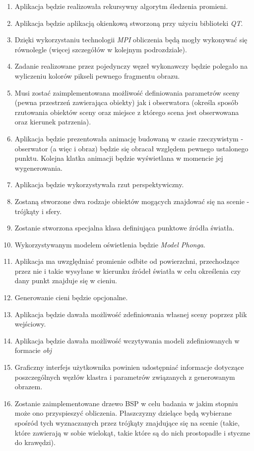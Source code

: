\begin{enumerate}
	\item Aplikacja będzie realizowała rekursywny algorytm śledzenia promieni.
	\item Aplikacja będzie aplikacją okienkową stworzoną przy użyciu biblioteki \emph{QT}.
	\item Dzięki wykorzystaniu technologii \emph{MPI} obliczenia będą mogły wykonywać się równolegle (więcej szczegółów w kolejnym podrozdziale).
	\item Zadanie realizowane przez pojedynczy węzeł wykonawczy będzie polegało na wyliczeniu kolorów pikseli pewnego fragmentu obrazu.
	\item Musi zostać zaimplementowana możliwość definiowania parametrów sceny (pewna przestrzeń zawierająca obiekty) jak i obserwatora (określa sposób rzutowania obiektów sceny oraz miejsce z którego scena jest obserwowana oraz kierunek patrzenia).
	\item Aplikacja będzie prezentowała animację budowaną w czasie rzeczywistym - obserwator (a więc i obraz) będzie się obracał względem pewnego ustalonego punktu. Kolejna klatka animacji będzie wyświetlana w momencie jej wygenerowania.
	\item Aplikacja będzie wykorzystywała rzut perspektywiczny.
	\item Zostaną stworzone dwa rodzaje obiektów mogących znajdować się na scenie - trójkąty i sfery.
	\item Zostanie stworzona specjalna klasa definiująca punktowe źródła światła.
	\item Wykorzystywanym modelem oświetlenia będzie \emph{Model Phonga}.
	\item Aplikacja ma uwzględniać promienie odbite od powierzchni, przechodzące przez nie i takie wysyłane w kierunku źródeł światła w celu określenia czy dany punkt znajduje się w cieniu.
	\item Generowanie cieni będzie opcjonalne.
	\item Aplikacja będzie dawała możliwość zdefiniowania własnej sceny poprzez plik wejściowy.
	\item Aplikacja będzie dawała możliwość wczytywania modeli zdefiniowanych w formacie \emph{obj}
	\item Graficzny interfejs użytkownika powinien udostępniać informacje dotyczące poszczególnych węzłów klastra i parametrów związanych z generowanym obrazem.
	\item Zostanie zaimplementowane drzewo BSP w celu badania w jakim stopniu może ono przyspieszyć obliczenia. Płaszczyzny dzielące będą wybierane spośród tych wyznaczanych przez trójkąty znajdujące się na scenie (takie, które zawierają w sobie wielokąt, takie które są do nich prostopadłe i styczne do krawędzi).

\end{enumerate}
